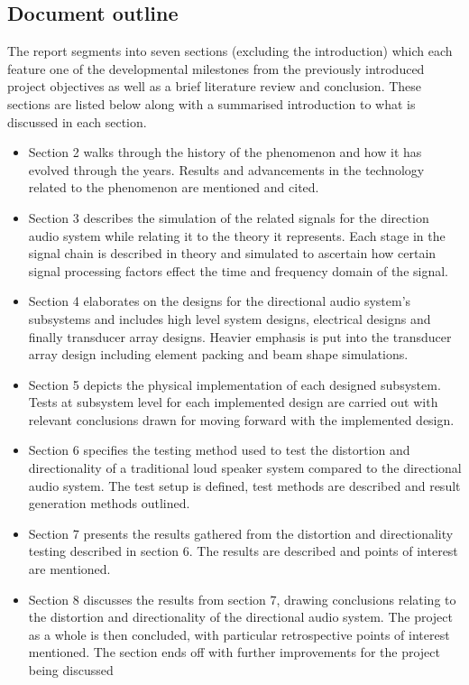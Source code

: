 \subsection{Document outline}
The report segments into seven sections (excluding the introduction) which each feature one of the developmental milestones from the previously introduced project objectives as well as a brief literature review and conclusion. These sections are listed below along with a summarised introduction to what is discussed in each section.
\begin{itemize}
    \item Section 2 walks through the history of the phenomenon and how it has evolved through the years. Results and advancements in the technology related to the phenomenon are mentioned and cited.
    \item Section 3 describes the simulation of the related signals for the direction audio system while relating it to the theory it represents. Each stage in the signal chain is described in theory and simulated to ascertain how certain signal processing factors effect the time and frequency domain of the signal.  
    \item Section 4 elaborates on the designs for the directional audio system's subsystems and includes high level system designs, electrical designs and finally transducer array designs. Heavier emphasis is put into the transducer array design including element packing and beam shape simulations.
    \item Section 5 depicts the physical implementation of each designed subsystem. Tests at subsystem level for each implemented design are carried out with relevant conclusions drawn for moving forward with the implemented design.
    \item Section 6 specifies the testing method used to test the distortion and directionality of a traditional loud speaker system compared to the directional audio system. The test setup is defined, test methods are described and result generation methods outlined.
    \item Section 7 presents the results gathered from the distortion and directionality testing described in section 6. The results are described and points of interest are mentioned.
    \item Section 8 discusses the results from section 7, drawing conclusions relating to the distortion and directionality of the directional audio system. The project as a whole is then concluded, with particular retrospective points of interest mentioned. The section ends off with further improvements for the project being discussed
\end{itemize}